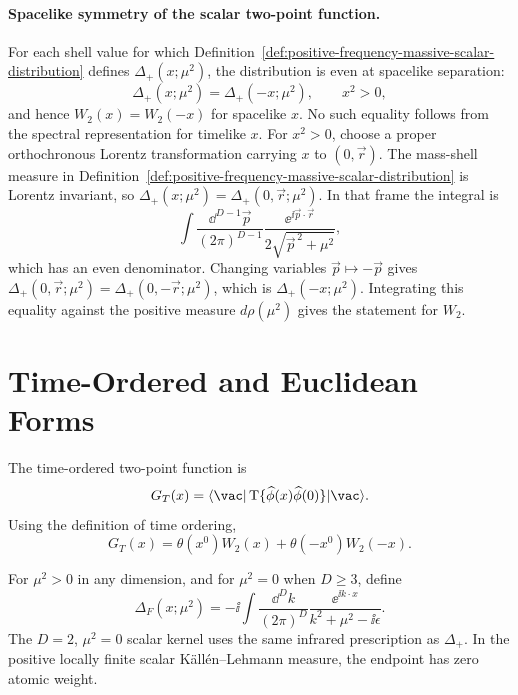 \paragraph{Spacelike symmetry of the scalar two-point function.}
For each shell value for which
Definition~\ref{def:positive-frequency-massive-scalar-distribution} defines
\(\Delta_+(x;\mu^2)\), the distribution is even at spacelike separation:
\[
  \Delta_+(x;\mu^2)=\Delta_+(-x;\mu^2),
  \qquad x^2>0,
\]
and hence \(W_2(x)=W_2(-x)\) for spacelike \(x\).  No such equality follows
from the spectral representation for timelike \(x\).
For \(x^2>0\), choose a proper orthochronous Lorentz transformation carrying
\(x\) to \((0,\vec r)\).  The mass-shell measure in
Definition~\ref{def:positive-frequency-massive-scalar-distribution} is
Lorentz invariant, so \(\Delta_+(x;\mu^2)=\Delta_+(0,\vec r;\mu^2)\).  In
that frame the integral is
\[
  \int
  \frac{\dd^{D-1}\vec p}{(2\pi)^{D-1}}
  \frac{\ee^{\ii\vec p\cdot\vec r}}{2\sqrt{\vec p^{\,2}+\mu^2}},
\]
which has an even denominator.  Changing variables \(\vec p\mapsto-\vec p\)
gives
\(\Delta_+(0,\vec r;\mu^2)=\Delta_+(0,-\vec r;\mu^2)\), which is
\(\Delta_+(-x;\mu^2)\).  Integrating this equality against the positive
measure \(d\rho(\mu^2)\) gives the statement for \(W_2\).

\section{Time-Ordered and Euclidean Forms}

\begin{definition}
\label{def:kallen-lehmann-time-ordered-two-point}
The time-ordered two-point function is
\[
  G_T(x)
  =
  \langle\vac|
  \operatorname{T}\{
    \widehat\phi(x)\widehat\phi(0)
  \}
  |\vac\rangle.
\]
Using the definition of time ordering,
\[
  G_T(x)
  =
  \theta(x^0)W_2(x)+\theta(-x^0)W_2(-x).
\]
\end{definition}

\begin{definition}
\label{def:kallen-lehmann-massive-feynman-kernel}
For \(\mu^2>0\) in any dimension, and for \(\mu^2=0\) when \(D\ge3\), define
\[
  \Delta_F(x;\mu^2)
  =
  -\ii
  \int\frac{\dd^Dk}{(2\pi)^D}
  \frac{\ee^{\ii k\cdot x}}{k^2+\mu^2-\ii\epsilon}.
\]
The \(D=2\), \(\mu^2=0\) scalar kernel uses the same infrared prescription as
\(\Delta_+\).  In the positive locally finite scalar K\"all\'en--Lehmann
measure, the endpoint has zero atomic weight.
\end{definition}

